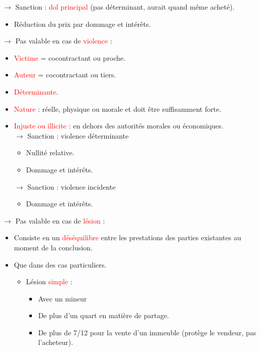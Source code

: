 \begin{itemize}
\begin{itemize}
\begin{itemize}
		\end{itemize}
		$\rightarrow$ Sanction : \textcolor{red}{dol principal} (pas déterminant, aurait quand même acheté).
		\begin{itemize}
			\item Réduction du prix par dommage et intérêts.
		\end{itemize}
	\end{itemize}
	$\rightarrow$ Pas valable en cas de \textcolor{red}{violence} :
	\begin{itemize}
		\item \textcolor{red}{Victime} = cocontractant ou proche.
		\item \textcolor{red}{Auteur} = cocontractant ou tiers.
		\item \textcolor{red}{Déterminante}.
		\item \textcolor{red}{Nature} : réelle, physique ou morale et doit être suffisamment forte.
		\item \textcolor{red}{Injuste ou illicite} : en dehors des autorités morales ou économiques.\\
		$\rightarrow$ Sanction : violence déterminante
		\begin{itemize}
			\item Nullité relative.
			\item Dommage et intérêts.
		\end{itemize}
		$\rightarrow$ Sanction : violence incidente
		\begin{itemize}
			\item Dommage et intérêts.
		\end{itemize}
	\end{itemize}
	$\rightarrow$ Pas valable en cas de \textcolor{red}{lésion} :
	\begin{itemize}
		\item Consiste en un \textcolor{red}{déséquilibre} entre les prestations des parties existantes au moment de la conclusion.
		\item Que dans des cas particuliers.
		\begin{itemize}
			\item Lésion \textcolor{red}{simple} :
			\begin{itemize}
				\item Avec un mineur
				\item De plus d'un quart en matière de partage.
				\item De plus de 7/12 pour la vente d'un immeuble (protège le vendeur, pas l'acheteur).
			\end{itemize}

\end{itemize}
\end{itemize}
\end{itemize}

